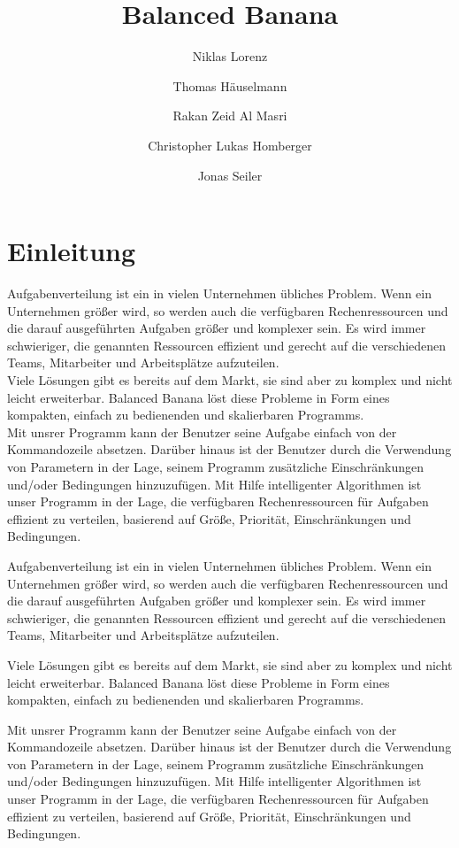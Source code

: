 \documentclass[a4paper,12pt]{article}
\title{Balanced Banana}
\author{Niklas Lorenz \and Thomas Häuselmann \and Rakan Zeid Al Masri \and Christopher Lukas Homberger \and Jonas Seiler}
\begin{document}
\setcounter{page}{2}
\tableofcontents          %
\clearpage
{}

\section{Einleitung}
\vspace*{1.5cm}
Aufgabenverteilung ist ein in vielen Unternehmen übliches Problem. Wenn ein Unternehmen größer wird, 
so werden auch die verfügbaren Rechenressourcen und die darauf ausgeführten Aufgaben größer und komplexer sein. Es wird immer schwieriger, die genannten Ressourcen effizient und gerecht auf die verschiedenen Teams, Mitarbeiter und Arbeitsplätze aufzuteilen. \\

Viele Lösungen gibt es bereits auf dem Markt, sie sind aber zu komplex und nicht leicht erweiterbar. Balanced Banana löst diese Probleme in Form eines kompakten, einfach zu bedienenden und skalierbaren Programms. \\

Mit unsrer Programm kann der Benutzer seine Aufgabe einfach von der Kommandozeile absetzen. Darüber hinaus ist der Benutzer durch die Verwendung von Parametern in der Lage, seinem Programm zusätzliche Einschränkungen und/oder Bedingungen hinzuzufügen. Mit Hilfe intelligenter Algorithmen ist unser Programm in der Lage, die verfügbaren Rechenressourcen für Aufgaben effizient zu verteilen, basierend auf Größe, Priorität, Einschränkungen und Bedingungen.

Aufgabenverteilung ist ein in vielen Unternehmen übliches Problem. Wenn ein Unternehmen größer wird, 
so werden auch die verfügbaren Rechenressourcen und die darauf ausgeführten Aufgaben größer und komplexer sein. Es wird immer schwieriger, die genannten Ressourcen effizient und gerecht auf die verschiedenen Teams, Mitarbeiter und Arbeitsplätze aufzuteilen. 

Viele Lösungen gibt es bereits auf dem Markt, sie sind aber zu komplex und nicht leicht erweiterbar. Balanced Banana löst diese Probleme in Form eines kompakten, einfach zu bedienenden und skalierbaren Programms.

Mit unsrer Programm kann der Benutzer seine Aufgabe einfach von der Kommandozeile absetzen. Darüber hinaus ist der Benutzer durch die Verwendung von Parametern in der Lage, seinem Programm zusätzliche Einschränkungen und/oder Bedingungen hinzuzufügen. Mit Hilfe intelligenter Algorithmen ist unser Programm in der Lage, die verfügbaren Rechenressourcen für Aufgaben effizient zu verteilen, basierend auf Größe, Priorität, Einschränkungen und Bedingungen.
\end{document}
